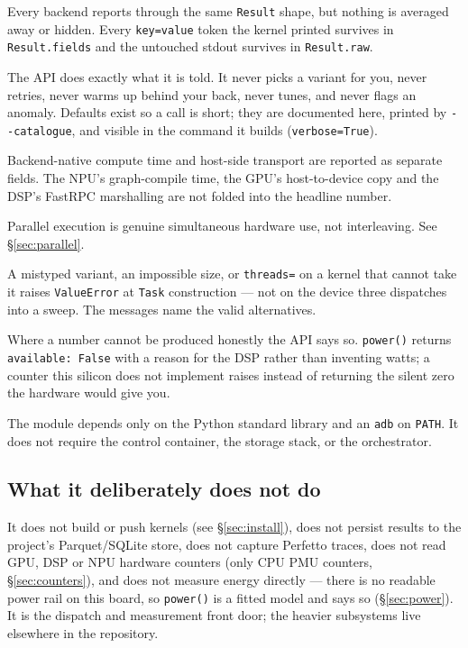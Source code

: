 \documentclass[11pt,a4paper]{article}
\newcommand{\code}[1]{\texttt{\let\_\breakableunderscore #1}}
\newcommand{\breakableunderscore}{\textunderscore\allowbreak}
\begin{document}
\begin{description}[leftmargin=1.6cm,style=nextline,font=\normalfont\itshape]
  \item[Uniform, not lossy.] Every backend reports through the same
    \code{Result} shape, but nothing is averaged away or hidden. Every
    \code{key=value} token the kernel printed survives in \code{Result.fields}
    and the untouched stdout survives in \code{Result.raw}.
  \item[Tool, not agent.] The API does exactly what it is told. It never picks
    a variant for you, never retries, never warms up behind your back, never
    tunes, and never flags an anomaly. Defaults exist so a call is short; they
    are documented here, printed by \code{-{}-catalogue}, and visible in the
    command it builds (\code{verbose=True}).
  \item[Costs stay visible.] Backend-native compute time and host-side
    transport are reported as separate fields. The NPU's graph-compile time,
    the GPU's host-to-device copy and the DSP's FastRPC marshalling are not
    folded into the headline number.
  \item[Real concurrency.] Parallel execution is genuine simultaneous hardware
    use, not interleaving. See \S\ref{sec:parallel}.
  \item[Fail early, on the host.] A mistyped variant, an impossible size, or
    \code{threads=} on a kernel that cannot take it raises \code{ValueError} at
    \code{Task} construction --- not on the device three dispatches into a
    sweep. The messages name the valid alternatives.
  \item[Refuse rather than guess.] Where a number cannot be produced honestly
    the API says so. \code{power()} returns \code{available: False} with a
    reason for the DSP rather than inventing watts; a counter this silicon does
    not implement raises instead of returning the silent zero the hardware
    would give you.
  \item[Standalone.] The module depends only on the Python standard library and
    an \code{adb} on \code{PATH}. It does not require the control container,
    the storage stack, or the orchestrator.
\end{description}

\subsection{What it deliberately does not do}

It does not build or push kernels (see \S\ref{sec:install}), does not persist
results to the project's Parquet/SQLite store, does not capture Perfetto
traces, does not read GPU, DSP or NPU hardware counters (only CPU PMU counters,
\S\ref{sec:counters}), and does not measure energy directly --- there is no
readable power rail on this board, so \code{power()} is a fitted model and says
so (\S\ref{sec:power}). It is the dispatch and measurement front door; the
heavier subsystems live elsewhere in the repository.
\end{document}

